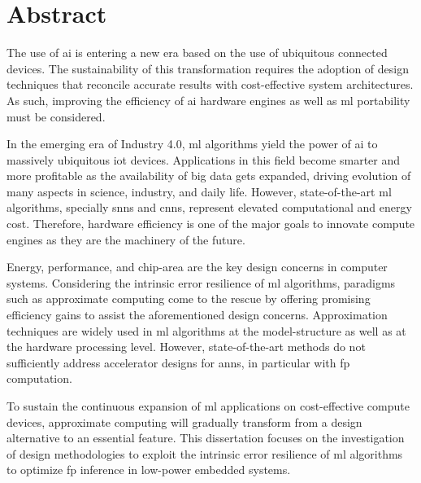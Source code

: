 \chapter*{Abstract}
\thispagestyle{empty}
The use of \gls{ai} is entering a new era based on the use of ubiquitous connected devices. The sustainability of this transformation requires the adoption of design techniques that reconcile accurate results with cost-effective system architectures. As such, improving the efficiency of \gls{ai} hardware engines as well as \gls{ml} portability must be considered.

In the emerging era of Industry 4.0, \gls{ml} algorithms yield the power of \gls{ai} to massively ubiquitous \gls{iot} devices. Applications in this field become smarter and more profitable as the availability of big data gets expanded, driving evolution of many aspects in science, industry, and daily life. However, state-of-the-art \gls{ml} algorithms, specially \glspl{snn} and \glspl{cnn}, represent elevated computational and energy cost. Therefore, hardware efficiency is one of the major goals to innovate compute engines as they are the machinery of the future.

Energy, performance, and chip-area are the key design concerns in computer systems. Considering the intrinsic error resilience of \gls{ml} algorithms, paradigms such as approximate computing come to the rescue by offering promising efficiency gains to assist the aforementioned design concerns. Approximation techniques are widely used in \gls{ml} algorithms at the model-structure as well as at the hardware processing level. However, state-of-the-art methods do not sufficiently address accelerator designs for \glspl{ann}, in particular with \gls{fp} computation.

To sustain the continuous expansion of \gls{ml} applications on cost-effective compute devices, approximate computing will gradually transform from a design alternative to an essential feature. This dissertation focuses on the investigation of design methodologies to exploit the intrinsic error resilience of \gls{ml} algorithms to optimize \gls{fp} inference in low-power embedded systems.

